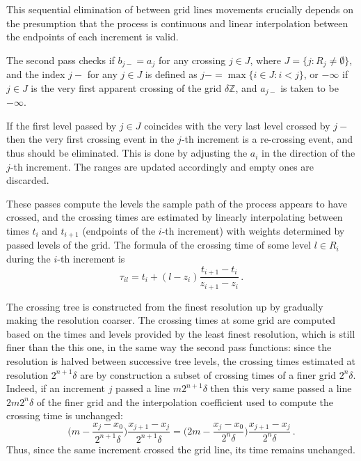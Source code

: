 \documentclass[a4paper]{article}
\begin{document}
This sequential elimination of between grid lines movements crucially depends on
the presumption that the process is continuous and linear interpolation between
the endpoints of each increment is valid.

The second pass checks if $b_{j-} = a_j$ for any crossing $j\in J$, where
$J = \{j : R_j\neq \emptyset\}$, and the index $j-$ for any $j\in J$ is defined as
$j- = \max\{i\in J : i < j\}$, or $-\infty$ if $j\in J$ is the very first apparent
crossing of the grid $\delta \mathbb{Z}$, and $a_{j-}$ is taken to be $-\infty$.

If the first level passed by $j\in J$ coincides with the very last level crossed
by $j-$ then the very first crossing event in the $j$-th increment is a re-crossing
event, and thus should be eliminated. This is done by adjusting the $a_i$ in the
direction of the $j$-th increment. The ranges are updated accordingly and empty
ones are discarded.

These passes compute the levels the sample path of the process appears to have
crossed, and the crossing times are estimated by linearly interpolating between
times $t_i$ and $t_{i+1}$ (endpoints of the $i$-th increment) with weights determined
by passed levels of the grid. The formula of the crossing time of some level $l\in R_i$
during the $i$-th increment is
\[ \tau_{il} = t_i + (l - z_i) \frac{t_{i+1} - t_i}{z_{i+1} - z_i} \,. \]

The crossing tree is constructed from the finest resolution up by gradually making
the resolution coarser. The crossing times at some grid are computed based on the 
times and levels provided by the least finest resolution, which is still finer than
the this one, in the same way the second pass functions: since the resolution is
halved between successive tree levels, the crossing times estimated at resolution
$2^{n+1} \delta$ are by construction a subset of crossing times of a finer grid
$2^n\delta$. Indeed, if an increment $j$ passed a line $m 2^{n+1} \delta$ then
this very same passed a line $2m 2^n\delta$ of the finer grid and the interpolation
coefficient used to compute the crossing time is unchanged:
\[
    \biggl( m - \frac{x_j - x_0}{2^{n+1} \delta} \biggr) \frac{x_{j+1} - x_j}{2^{n+1} \delta}
    = \biggl( 2m - \frac{x_j - x_0}{2^n\delta} \biggr) \frac{x_{j+1} - x_j}{2^n\delta} \,.
\]
Thus, since the same increment crossed the grid line, its time remains unchanged.
\end{document}
